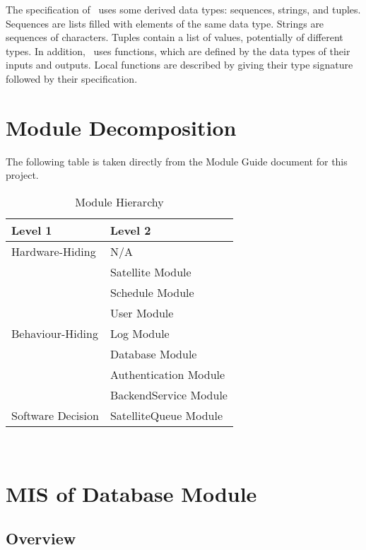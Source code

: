 \documentclass[12pt, titlepage]{article}
\begin{document}
\noindent
The specification of \progname \ uses some derived data types: sequences, strings, and
tuples. Sequences are lists filled with elements of the same data type. Strings
are sequences of characters. Tuples contain a list of values, potentially of
different types. In addition, \progname \ uses functions, which
are defined by the data types of their inputs and outputs. Local functions are
described by giving their type signature followed by their specification.

\section{Module Decomposition}

The following table is taken directly from the Module Guide document for this project.

\begin{table}[h!]
\centering
\begin{tabular}{p{} p{}}
\toprule
\textbf{Level 1} & \textbf{Level 2}\\
\midrule

{Hardware-Hiding} & N/A ~ \\
\midrule

\multirow{7}{0.3\textwidth}{Behaviour-Hiding} & Satellite Module\\
& Schedule Module\\
& User Module\\
& Log Module\\
& Database Module\\
& Authentication Module\\
& BackendService Module \\
\midrule

\multirow{1}{0.3\textwidth}{Software Decision} & SatelliteQueue Module \\
\bottomrule

\end{tabular}
\caption{Module Hierarchy}
\label{TblMH}
\end{table}

\newpage
~\newpage


\section{MIS of Database Module} \label{Module}

\subsection{ Overview}
\end{document}
